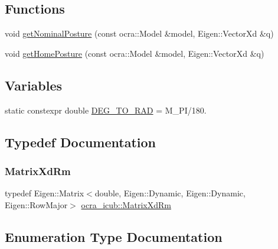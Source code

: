 \subsection*{Functions}
\begin{DoxyCompactItemize}
\item 
void \hyperlink{namespaceocra__icub_a07ffe33877389b6b111944e8a666e221}{get\+Nominal\+Posture} (const ocra\+::\+Model \&model, Eigen\+::\+Vector\+Xd \&q)
\item 
void \hyperlink{namespaceocra__icub_a91c3caf94014ea9988e56dd2572768ce}{get\+Home\+Posture} (const ocra\+::\+Model \&model, Eigen\+::\+Vector\+Xd \&q)
\end{DoxyCompactItemize}
\subsection*{Variables}
\begin{DoxyCompactItemize}
\item 
static constexpr double \hyperlink{namespaceocra__icub_ab06477ded34ed5514b911a3511b22e3d}{D\+E\+G\+\_\+\+T\+O\+\_\+\+R\+AD} = M\+\_\+\+PI/180.
\end{DoxyCompactItemize}


\subsection{Typedef Documentation}
\hypertarget{namespaceocra__icub_aa5e36a19ed031c28ca83c207bd7dd83f}{}\label{namespaceocra__icub_aa5e36a19ed031c28ca83c207bd7dd83f} 
\subsubsection{\texorpdfstring{Matrix\+Xd\+Rm}{MatrixXdRm}}
{\footnotesize\ttfamily typedef Eigen\+::\+Matrix$<$double, Eigen\+::\+Dynamic, Eigen\+::\+Dynamic, Eigen\+::\+Row\+Major$>$ \hyperlink{namespaceocra__icub_aa5e36a19ed031c28ca83c207bd7dd83f}{ocra\+\_\+icub\+::\+Matrix\+Xd\+Rm}}



\subsection{Enumeration Type Documentation}
\hypertarget{namespaceocra__icub_afbd2db66b68005fb7cfac19210caf83f}{}\label{namespaceocra__icub_afbd2db66b68005fb7cfac19210caf83f} 
